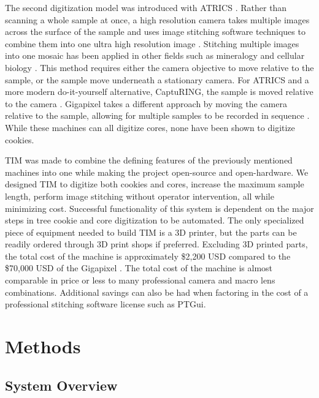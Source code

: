 \documentclass[a4paper,12pt]{article}
\begin{document}
The second digitization model was introduced with ATRICS \citep{levanic_atrics_2007}. 
Rather than scanning a whole sample at once, a high resolution camera takes multiple images across the surface of the sample and uses image stitching software techniques to combine them into one ultra high resolution image \citep{muhlich_stitching_2022}.
Stitching multiple images into one mosaic has been applied in other fields such as mineralogy and cellular biology \citep{ro_image_2021,mohammadi_fast_2024}. 
This method requires either the camera objective to move relative to the sample, or the sample move underneath a stationary camera. 
For ATRICS and a more modern do-it-yourself alternative, CaptuRING, the sample is moved relative to the camera \citep{garcia-hidalgo_capturing_2022}. 
Gigapixel takes a different approach by moving the camera relative to the sample, allowing for multiple samples to be recorded in sequence \citep{griffin_gigapixel_2021}. 
While these machines can all digitize cores, none have been shown to digitize cookies.

TIM was made to combine the defining features of the previously mentioned machines into one while making the project open-source and open-hardware. 
We designed TIM to digitize both cookies and cores, increase the maximum sample length, perform image stitching without operator intervention, all while minimizing cost. 
Successful functionality of this system is dependent on the major steps in tree cookie and core digitization to be automated. 
The only specialized piece of equipment needed to build TIM is a 3D printer, but the parts can be readily ordered through 3D print shops if preferred.
Excluding 3D printed parts, the total cost of the machine is approximately \$2,200 USD compared to the \$70,000 USD of the Gigapixel \citep{griffin_gigapixel_2021}.
The total cost of the machine is almost comparable in price or less to many professional camera and macro lens combinations.
Additional savings can also be had when factoring in the cost of a professional stitching software license such as PTGui. 

\section{Methods}

\subsection{System Overview} %
\end{document}
